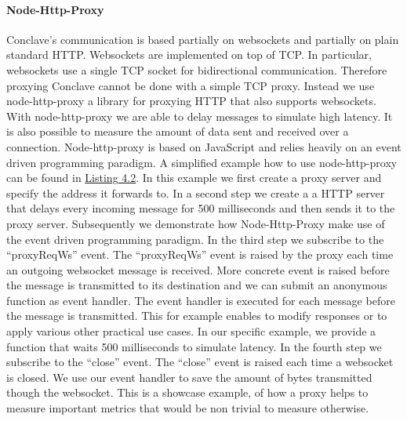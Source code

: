  \paragraph{Node-Http-Proxy}
 Conclave's communication is based partially on websockets and partially on plain standard HTTP.
 Websockets are implemented on top of TCP. In particular, websockets use a single TCP socket for bidirectional communication. Therefore proxying Conclave cannot be done with a simple TCP proxy. Instead we use node-http-proxy a library for proxying HTTP that also supports websockets. With node-http-proxy we are able to delay messages to simulate high latency. It is also possible to measure the amount of data sent and received over a connection.
 Node-http-proxy is based on JavaScript and relies heavily on an event driven programming paradigm. A simplified example how to use node-http-proxy can be found in \hyperref[the_label]{Listing 4.2}. In this example we first create a proxy server and specify the address it forwards to. In a second step we create a a HTTP server that delays every incoming message for 500 milliseconds and then sends it to the proxy server. Subsequently we demonstrate how Node-Http-Proxy make use of the event driven programming paradigm. In the third step we subscribe to the ``proxyReqWs'' event. The ``proxyReqWs'' event is raised by the proxy each time an outgoing websocket message is received. More concrete event is raised before the message is transmitted to its destination and we can submit an anonymous function as event handler. The event handler is executed for each message before the message is transmitted. This for example enables to modify responses or to apply various other practical use cases. In our specific example, we provide a function that waits 500 milliseconds to simulate latency. In the fourth step we subscribe to the ``close'' event. The ``close'' event is raised each time a websocket is closed. We use our event handler to save the amount of bytes transmitted though the websocket. This is a showcase example, of how a proxy helps to measure important metrics that would be non trivial to measure otherwise.
  \label{the_label}				
